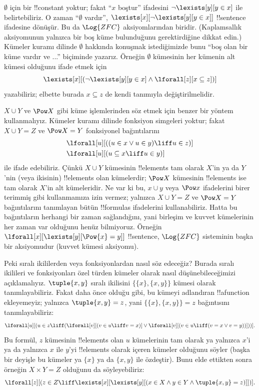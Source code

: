 $\emptyset$ için bir !!{constant} yoktur; fakat ``$x$ boştur'' ifadesini
$\lnot\lexists[y][y\in x]$ ile belirtebiliriz. O zaman ``$\emptyset$
vardır'', $\lexists[x][\lnot\lexists[y][y\in x]]$ !!{sentence}
ifadesine dönüşür. Bu da $\Log{ZFC}$ aksiyomlarından biridir.
(Kaplamsallık aksiyomunun yalnızca bir boş küme bulunduğunu gerektirdiğine
dikkat edin.) Kümeler kuramı dilinde $\emptyset$ hakkında konuşmak
istediğimizde bunu ``boş olan bir küme vardır ve ...'' biçiminde
yazarız. Örneğin $\emptyset$ kümesinin her kümenin alt kümesi olduğunu
ifade etmek için
\[
\lexists[x][(\lnot\lexists[y][y \in x] \land \lforall[z][x \subseteq z])]
\]
yazabiliriz; elbette burada $x\subseteq z$ de kendi tanımıyla
değiştirilmelidir.

$X\cup Y$ ve $\Pow X$ gibi küme işlemlerinden söz etmek için benzer bir
yöntem kullanmalıyız. Kümeler kuramı dilinde fonksiyon simgeleri yoktur;
fakat $X\cup Y=Z$ ve $\Pow X=Y$ fonksiyonel bağıntılarını
\begin{align*}
& \lforall[u][((u \in x \lor u \in y) \liff u \in z)]\\
& \lforall[u][(u \subseteq x \liff u \in y)]
\end{align*}
ile ifade edebiliriz. Çünkü $X\cup Y$ kümesinin !!{element}s tam olarak
$X$'in ya da $Y$'nin (veya ikisinin) !!{element}s olan kümelerdir;
$\Pow X$ kümesinin !!{element}s ise tam olarak $X$'in alt kümeleridir.
Ne var ki bu, $x\cup y$ veya $\Pow x$ ifadelerini birer terimmiş gibi
kullanmamıza izin vermez; yalnızca $X\cup Y=Z$ ve $\Pow X=Y$
bağıntılarını tanımlayan bütün !!{formula}s ifadelerini kullanabiliriz.
Hatta bu bağıntıların herhangi bir zaman sağlandığını, yani birleşim ve
kuvvet kümelerinin her zaman var olduğunu henüz bilmiyoruz. Örneğin
$\lforall[x][\lexists[y][\Pow{x}=y]]$ !!{sentence}, $\Log{ZFC}$
sisteminin başka bir aksiyomudur (kuvvet kümesi aksiyomu).

Peki sıralı ikililerden veya fonksiyonlardan nasıl söz edeceğiz? Burada
sıralı ikilileri ve fonksiyonları özel türden kümeler olarak nasıl
düşünebileceğimizi açıklamalıyız. $\tuple{x,y}$ sıralı ikilisini
$\{\{x\},\{x,y\}\}$ kümesi olarak tanımlayabiliriz. Fakat daha önce
olduğu gibi, bu kümeyi adlandıran !!a{function} ekleyemeyiz; yalnızca
$\tuple{x,y}=z$, yani $\{\{x\},\{x,y\}\}=z$ bağıntısını tanımlayabiliriz:
\[
\lforall[u][(u \in z \liff (\lforall[v][(v \in u \liff v = x)] \lor
  \lforall[v][(v \in u \liff (v = x \lor v = y))]))].
\]
Bu formül, $z$ kümesinin !!{element}s olan $u$ kümelerinin tam olarak
ya yalnızca $x$'i ya da yalnızca $x$ ile $y$'yi !!{element}s olarak
içeren kümeler olduğunu söyler (başka bir deyişle bu kümeler ya
$\{x\}$ ya da $\{x,y\}$ ile özdeştir). Bunu elde ettikten sonra örneğin
$X\times Y=Z$ olduğunu da söyleyebiliriz:
\[
\lforall[z][(z \in Z \liff \lexists[x][\lexists[y][(x \in
        X \land y \in Y \land \tuple{x, y} = z)]])].
\]

